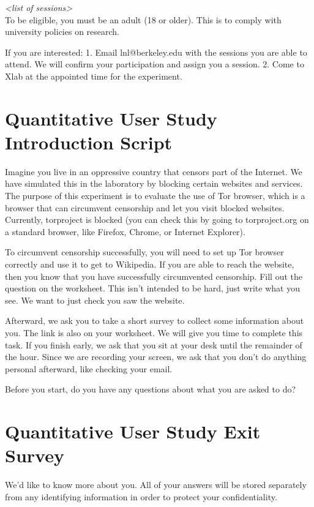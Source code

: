 \documentclass{template}
\begin{document}
\textit{<list of sessions>}\\

To be eligible, you must be an adult (18 or older). This is to comply with university policies on research. 

If you are interested: 1. Email lnl@berkeley.edu with the sessions you are able to attend. We will confirm your participation and assign you a session. 2. Come to Xlab at the appointed time for the experiment.

\section{Quantitative User Study Introduction Script} 
\label{quantitative-script} 
Imagine you live in an oppressive country that censors part of the Internet. We have simulated this in the laboratory by blocking certain websites and services.  The purpose of this experiment is to evaluate the use of Tor browser, which is a browser that can circumvent censorship and let you visit blocked websites. Currently, torproject is blocked (you can check this by going to torproject.org on a standard browser, like Firefox, Chrome, or Internet Explorer). 

To circumvent censorship successfully, you will need to set up Tor browser correctly and use it to get to Wikipedia. If you are able to reach the website, then you know that you have successfully circumvented censorship. Fill out the question on the worksheet. This isn’t intended to be hard, just write what you see. We want to just check you saw the website. 

Afterward, we ask you to take a short survey to collect some information about you. The link is also on your worksheet.
We will give you time to complete this task. If you finish early, we ask that you sit at your desk until the remainder of the hour. Since we are recording your screen, we ask that you don't do anything personal afterward, like checking your email.

Before you start, do you have any questions about what you are asked to do? 

\section{Quantitative User Study Exit Survey} 
\label{quantitative-exit-survey}
We'd like to know more about you.  All of your answers will be stored separately from any identifying information in order to protect your confidentiality.
\end{document}
